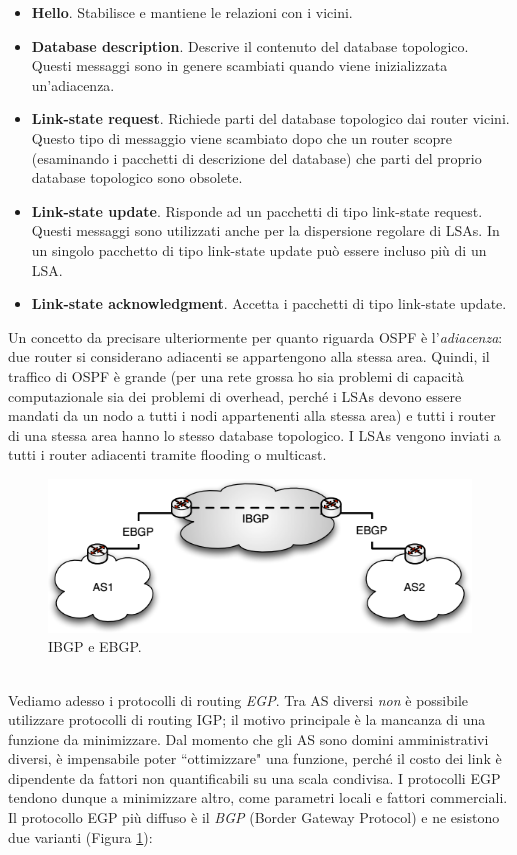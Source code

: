 \begin{itemize}
	\item \textbf{Hello}. Stabilisce e mantiene le relazioni con i vicini.
	\item \textbf{Database description}. Descrive il contenuto del database topologico. Questi messaggi sono in genere scambiati quando viene inizializzata un'adiacenza.
	\item \textbf{Link-state request}. Richiede parti del database topologico dai router vicini. Questo tipo di messaggio viene scambiato dopo che un router scopre (esaminando i pacchetti di descrizione del database) che parti del proprio database topologico sono obsolete.
	\item \textbf{Link-state update}. Risponde ad un pacchetti di tipo link-state request. Questi messaggi sono utilizzati anche per la dispersione regolare di LSAs. In un singolo pacchetto di tipo link-state update può essere incluso più di un LSA.
	\item \textbf{Link-state acknowledgment}. Accetta i pacchetti di tipo link-state update.
\end{itemize}
Un concetto da precisare ulteriormente per quanto riguarda OSPF è l'\textit{adiacenza}: due router si considerano adiacenti se appartengono alla stessa area. Quindi, il traffico di OSPF è grande (per una rete grossa ho sia problemi di capacità computazionale sia dei problemi di overhead, perché i LSAs devono essere mandati da un nodo a tutti i nodi appartenenti alla stessa area) e tutti i router di una stessa area hanno lo stesso database topologico. I LSAs vengono inviati a tutti i router adiacenti tramite flooding o multicast.
\begin{figure}[htbp]
	\centering
	\includegraphics[scale = 0.5]{images/BGP}
	\caption{IBGP e EBGP.}
	\label{img:BGP}
\end{figure}\\
Vediamo adesso i protocolli di routing \textit{EGP}. Tra AS diversi \textit{non} è possibile utilizzare protocolli di routing IGP; il motivo principale è la mancanza di una funzione da minimizzare. Dal momento che gli AS sono domini amministrativi diversi, è impensabile poter \textquotedblleft ottimizzare" una funzione, perché il costo dei link è dipendente da fattori non quantificabili su una scala condivisa. I protocolli EGP tendono dunque a minimizzare altro, come parametri locali e fattori commerciali. Il protocollo EGP più diffuso è il \textit{BGP} (Border Gateway Protocol) e ne esistono due varianti (Figura \ref{img:BGP}):
